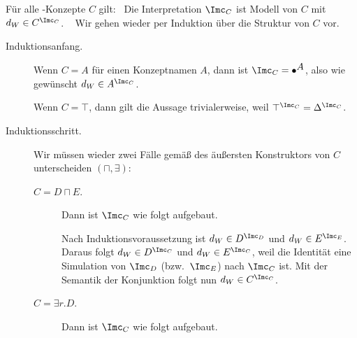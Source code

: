 \documentclass[fontsize=11pt, twoside=false, numbers=autoenddot]{scrbook}
\begin{document}
F\"ur alle \EL-Konzepte $C$ gilt:~
Die Interpretation $\Imc_C$ ist Modell von $C$ mit 
$d_W \in C^{\Imc_C}$.
%
\parII
{}~
Wir gehen wieder per Induktion über die Struktur von $C$ vor.
%
  \begin{description}
    \item[Induktionsanfang.]
      Wenn $C=A$ für einen Konzeptnamen $A$,
      dann ist $\Imc_C = \bullet^{\text{{\normalsize $A$}}}$,
      also wie gewünscht $d_W \in A^{\Imc_C}$.
      
      Wenn $C=\top$, dann gilt die Aussage trivialerweise, weil $\top^{\Imc_C} = \Delta^{\Imc_C}$.
    \item[Induktionsschritt.]
      Wir müssen wieder zwei Fälle gemäß des äußersten Konstruktors
      von $C$ unterscheiden $(\sqcap,\exists)$:
      \goodbreak
      \begin{description}
        \item[{\boldmath $C=D \sqcap E$.}]
          Dann ist $\Imc_C$ wie folgt aufgebaut.
          \begin{center}
          \end{center}
          \parI
          Nach Induktionsvoraussetzung ist $d_W \in D^{\Imc_D}$ und $d_W \in E^{\Imc_E}$.
          Daraus folgt $d_W \in D^{\Imc_C}$ und $d_W \in E^{\Imc_C}$,
          weil die Identität eine Simulation von $\Imc_D$ (bzw.\ $\Imc_E$) nach $\Imc_C$ ist.
          Mit der Semantik der Konjunktion folgt nun $d_W \in C^{\Imc_C}$.
          \parI
        \item[{\boldmath $C=\exists r.D$.}]
          Dann ist $\Imc_C$ wie folgt aufgebaut.
          \begin{center}
\end{center}
\end{description}
\end{description}
\end{document}
